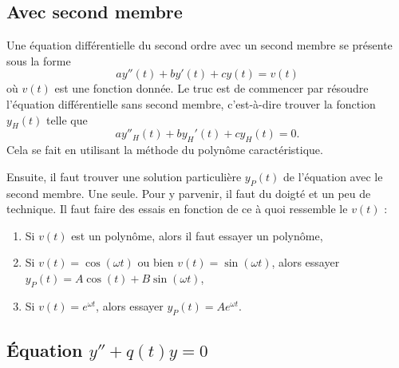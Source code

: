 \subsection{Avec second membre}

Une équation différentielle du second ordre avec un second membre se présente sous la forme
\begin{equation}
	ay''(t)+by'(t)+cy(t)=v(t)
\end{equation}
où $v(t)$ est une fonction donnée. Le truc est de commencer par résoudre l'équation différentielle sans second membre, c'est-à-dire trouver la fonction $y_H(t)$ telle que
\begin{equation}
	ay''_H(t)+by_H'(t)+cy_H(t)=0.
\end{equation}
Cela se fait en utilisant la méthode du polynôme caractéristique.

Ensuite, il faut trouver une solution particulière $y_P(t)$ de l'équation avec le second membre. Une seule. Pour y parvenir, il faut du doigté et un peu de technique. Il faut faire des essais en fonction de ce à quoi ressemble le $v(t)$ :
\begin{enumerate}

	\item
		Si $v(t)$ est un polynôme, alors il faut essayer un polynôme,

	\item
		Si $v(t)=\cos(\omega t)$ ou bien $v(t)=\sin(\omega t)$, alors essayer $y_P(t)=A\cos(t)+B\sin(\omega t)$,

	\item
		Si $v(t)= e^{\omega t}$, alors essayer $y_P(t)=A e^{\omega t}$.

\end{enumerate}

\subsection{Équation \texorpdfstring{$y''+q(t)y=0$}{y''+q(t)y=0}}
\label{subsecSyTwyM}


